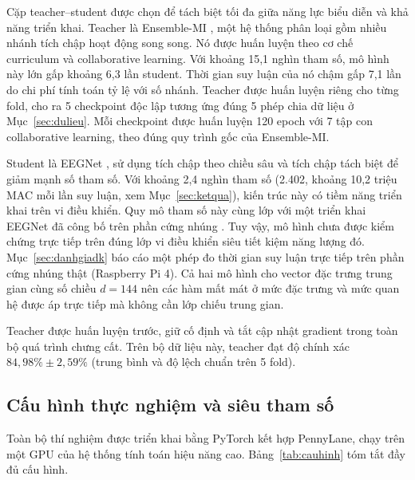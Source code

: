 Cặp teacher--student được chọn để tách biệt tối đa giữa năng lực biểu diễn
và khả năng triển khai. Teacher là Ensemble-MI \cite{zoumpourlis2024motor}, một hệ thống phân loại
gồm nhiều nhánh tích chập hoạt động song song. Nó được huấn luyện theo cơ
chế curriculum và collaborative learning. Với khoảng 15,1 nghìn tham số, mô hình này lớn gấp khoảng 6,3 lần student.
Thời gian suy luận của nó chậm gấp 7,1 lần do chi phí tính toán tỷ lệ với số
nhánh. Teacher được huấn luyện
riêng cho từng fold, cho ra 5 checkpoint độc lập tương ứng đúng 5 phép chia
dữ liệu ở Mục~\ref{sec:dulieu}. Mỗi checkpoint được huấn luyện 120 epoch với 7
tập con collaborative learning, theo đúng quy trình gốc của Ensemble-MI.

Student là EEGNet \cite{lawhern2018eegnet}, sử dụng tích chập theo chiều sâu
và tích chập tách biệt để giảm mạnh số tham số. Với khoảng 2,4 nghìn tham
số (2.402, khoảng 10,2 triệu MAC mỗi lần suy luận, xem Mục~\ref{sec:ketqua}),
kiến trúc này có tiềm năng triển khai trên vi điều khiển. Quy mô tham số
này cùng lớp với một triển khai EEGNet đã công bố trên phần cứng nhúng
\cite{wang2024mibminet}. Tuy vậy, mô hình chưa được kiểm chứng trực tiếp
trên đúng lớp vi điều khiển siêu tiết kiệm năng lượng đó. Mục~\ref{sec:danhgiadk} báo
cáo một phép đo thời gian suy luận trực tiếp trên phần cứng nhúng thật
(Raspberry Pi 4). Cả hai mô hình cho vector đặc trưng trung gian
cùng số chiều $d = 144$ nên các hàm mất mát ở mức đặc trưng và mức quan hệ
được áp trực tiếp mà không cần lớp chiếu trung gian.

Teacher được huấn luyện trước, giữ cố định và tắt cập nhật gradient trong
toàn bộ quá trình chưng cất. Trên bộ dữ liệu này, teacher đạt độ chính xác
$84{,}98\% \pm 2{,}59\%$ (trung bình và độ lệch chuẩn trên 5 fold).

\subsection{Cấu hình thực nghiệm và siêu tham số}
\label{sec:cauhinh}

Toàn bộ thí nghiệm được triển khai bằng PyTorch kết hợp PennyLane, chạy trên
một GPU của hệ thống tính toán hiệu năng cao. Bảng~\ref{tab:cauhinh} tóm tắt
đầy đủ cấu hình.

